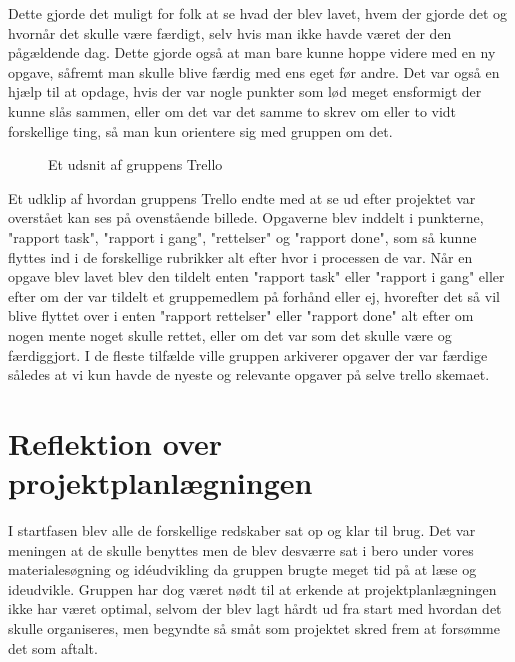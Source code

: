 \vspace{5mm}

 Dette gjorde det muligt for folk at se hvad der blev lavet, hvem der gjorde det og hvornår det skulle være færdigt, selv hvis man ikke havde været der den pågældende dag. Dette gjorde også at man bare kunne hoppe videre med en ny opgave, såfremt man skulle blive færdig med ens eget før andre. Det var også en hjælp til at opdage, hvis der var nogle punkter som lød meget ensformigt der kunne slås sammen, eller om det var det samme to skrev om eller to vidt forskellige ting, så man kun orientere sig med gruppen om det. 

\begin{figure}[H]
    \centering
    \caption{Et udsnit af gruppens Trello}
    \label{Trello}
\end{figure}

Et udklip af hvordan gruppens Trello endte med at se ud efter projektet var overstået kan ses på ovenstående billede. Opgaverne blev inddelt i punkterne, "rapport task", "rapport i gang", "rettelser" og "rapport done", som så kunne flyttes ind i de forskellige rubrikker alt efter hvor i processen de var. Når en opgave blev lavet blev den tildelt enten "rapport task" eller "rapport i gang" eller efter om der var tildelt et gruppemedlem på forhånd eller ej, hvorefter det så vil blive flyttet over i enten "rapport rettelser" eller "rapport done" alt efter om nogen mente noget skulle rettet, eller om det var som det skulle være og færdiggjort. I de fleste tilfælde ville gruppen arkiverer opgaver der var færdige således at vi kun havde de nyeste og relevante opgaver på selve trello skemaet.

\section{Reflektion over projektplanlægningen}\label{Reflektion-over-projektplanlaegningen}
I startfasen blev alle de forskellige redskaber sat op og klar til brug. Det var meningen at de skulle benyttes men de blev desværre sat i bero under vores materialesøgning og idéudvikling da gruppen brugte meget tid på at læse og ideudvikle. Gruppen har dog været nødt til at erkende at projektplanlægningen ikke har været optimal, selvom der blev lagt hårdt ud fra start med hvordan det skulle organiseres, men begyndte så småt som projektet skred frem at forsømme det som aftalt.

